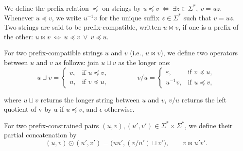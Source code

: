 We define the prefix relation $\preceq$ on strings by $
u\preceq v \:\Longleftrightarrow\: \exists z\in\Sigma^*,\ v=uz . \label{eq:prefix-relation}$ Whenever $u\preceq v$, we write $u^{-1}v$ for the unique suffix
$z\in\Sigma^*$ such that $v=uz$. Two strings are said to be prefix-compatible, written $u\bowtie v$, if one is a prefix of the other: $ u\bowtie v \:\Longleftrightarrow\: u\preceq v \ \vee\ v\preceq u . \label{eq:prefix-compatible} $

For two prefix-compatible strings $u$ and $v$ (i.e., $u \bowtie v $), we define two operators between $u$ and $v$ as follows: 
join $u\sqcup v$ as the longer one:
\begin{equation}
u\sqcup v =
\begin{cases}
v, & \text{if } u\preceq v,\\
u, & \text{if } v\preceq u,
\end{cases}
\qquad\qquad
v/u =
\begin{cases}
\varepsilon, & \text{if } v\preceq u,\\
u^{-1}v, & \text{if } u\preceq v,
\end{cases}
\label{eq:context-join and eq:context-after-consumption}
\end{equation}

where $u \sqcup v$ returns the longer string between $u$ and $v$, $v / u$ returns the left quotient of v by u if $u \preceq v$, and $\epsilon$ otherwise. 

For two prefix-constrained pairs $(u,v),(u',v')\in\Sigma^*\times\Sigma^*$, we define their partial concatenation by
\begin{equation}
(u,v)\odot(u',v')
=
\bigl(
uu',
(v/u')\sqcup v'
\bigr), \qquad v \bowtie u'v'.
\label{eq:pair-concatenation}
\end{equation}




